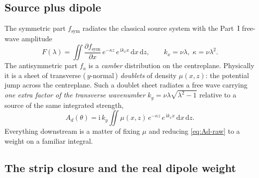 \documentclass[11pt]{article}
\newcommand{\ii}{\mathrm{i}}
\newcommand{\dd}{\,\mathrm{d}}
\begin{document}
\subsection{Source plus dipole}

The symmetric part $f_{\mathrm{sym}}$ radiates the classical source system with
the Part~I free-wave amplitude
\begin{equation}
  F(\lambda) = \iint \frac{\partial f_{\mathrm{sym}}}{\partial x}\,
    e^{-\kappa z}\, e^{\,\ii k_x x}\dd x\dd z,
  \qquad k_x = \nu\lambda,\; \kappa = \nu\lambda^2.
\end{equation}
The antisymmetric part $f_a$ is a \emph{camber} distribution on the centreplane.
Physically it is a sheet of transverse (\,$y$-normal\,) \emph{doublets} of density
$\mu(x,z)$: the potential jump across the centreplane. Such a doublet sheet
radiates a free wave carrying \emph{one extra factor of the transverse
wavenumber} $k_y = \nu\lambda\sqrt{\lambda^2-1}$ relative to a source of the same
integrated strength,
\begin{equation}
  A_d(\theta) = \ii\,k_y \iint \mu(x,z)\, e^{-\kappa z}\, e^{\,\ii k_x x}
    \dd x\dd z.
  \label{eq:Ad-raw}
\end{equation}
Everything downstream is a matter of fixing $\mu$ and reducing
\eqref{eq:Ad-raw} to a weight on a familiar integral.

\subsection{The strip closure and the real dipole weight}
\label{sec:stripweight}
\end{document}
